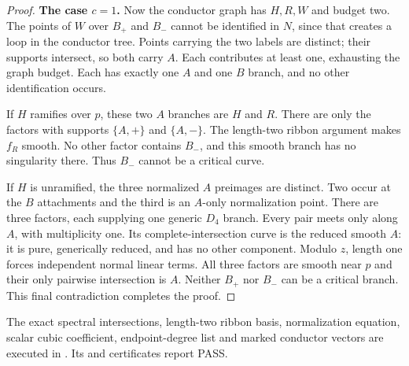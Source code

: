 \begin{proof}
\par\medskip\noindent\textbf{The case $c=1$.}
Now the conductor graph has $H,R,W$ and
budget two. The points of $W$ over $B_+$
and $B_-$ cannot be identified in $N$,
since that creates a loop in the conductor
tree. Points carrying the two labels are
distinct; their supports intersect, so
both carry $A$. Each contributes at least
one, exhausting the graph budget. Each
has exactly one $A$ and one $B$ branch,
and no other identification occurs.

If $H$ ramifies over $p$, these two
$A$ branches are $H$ and $R$. There are
only the factors with supports
$\{A,+\}$ and $\{A,-\}$. The length-two
ribbon argument makes $f_R$ smooth.
No other factor contains $B_-$, and this
smooth branch has no singularity there.
Thus $B_-$ cannot be a critical curve.

If $H$ is unramified, the three normalized
$A$ preimages are distinct. Two occur
at the $B$ attachments and the third
is an $A$-only normalization point.
There are three factors, each supplying
one generic $D_4$ branch. Every pair
meets only along $A$, with multiplicity
one. Its complete-intersection curve
is the reduced smooth $A$: it is pure,
generically reduced, and has no other
component. Modulo $z$, length one forces
independent normal linear terms.
All three factors are smooth near $p$
and their only pairwise intersection is
$A$. Neither $B_+$ nor $B_-$ can be a
critical branch. This final contradiction
completes the proof.
\end{proof}

The exact spectral intersections, length-two
ribbon basis, normalization equation, scalar
cubic coefficient, endpoint-degree list and
marked conductor vectors are executed in
.
Its  and  certificates
report PASS.
